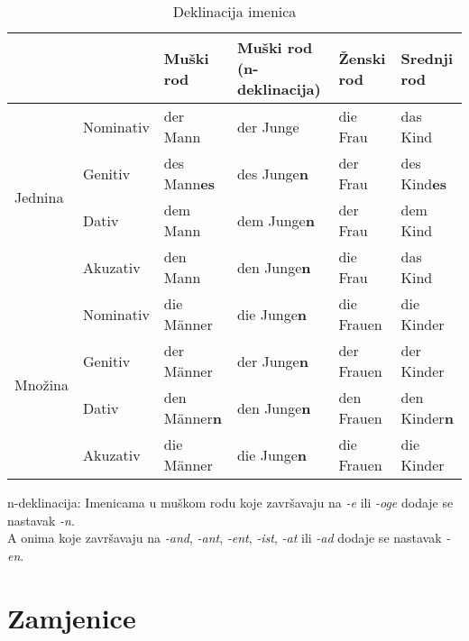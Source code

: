 \documentclass[12pt,german]{article}
\newcommand{\nastavak}[1]{\emph{-#1}}
\begin{document}
\begin{multicols}{2}
\begin{table*}[htb]
\caption{Deklinacija imenica}
\begin{tabular}{llllll}
\toprule
  &  & Muški rod & Muški rod (n-deklinacija) & Ženski rod & Srednji rod \\
\midrule
\multirow{4}{3mm}{\begin{sideways}\parbox{15mm}{Jednina}\end{sideways}}
& Nominativ & der Mann & der Junge & die Frau & das Kind \\
& Genitiv & des Mann\bf{es} & des Junge\bf{n} & der Frau & des Kind\bf{es} \\
& Dativ & dem Mann & dem Junge\bf{n} & der Frau & dem Kind \\
& Akuzativ & den Mann & den Junge\bf{n} & die Frau & das Kind \\
\midrule
\multirow{4}{3mm}{\begin{sideways}\parbox{15mm}{Množina}\end{sideways}}
& Nominativ & die M\"anner & die Junge\bf{n} & die Frauen & die Kinder \\
& Genitiv & der M\"anner & der Junge\bf{n} & der Frauen & der Kinder \\
& Dativ & den M\"anner\bf{n} & den Junge\bf{n} & den Frauen & den Kinder\bf{n} \\
& Akuzativ & die M\"anner & die Junge\bf{n} & die Frauen & die Kinder \\
\bottomrule
\end{tabular}
\begin{tablenotes}
  \small
  \item n-deklinacija: Imenicama u muškom rodu koje završavaju na \nastavak{e}
    ili \nastavak{oge} dodaje se nastavak \nastavak{n}.\\
    A onima koje završavaju na \nastavak{and}, \nastavak{ant}, \nastavak{ent},
    \nastavak{ist}, \nastavak{at} ili \nastavak{ad} dodaje se nastavak
    \nastavak{en}.
\end{tablenotes}
\end{table*}

\section{Zamjenice}


\end{multicols}
\end{document}
